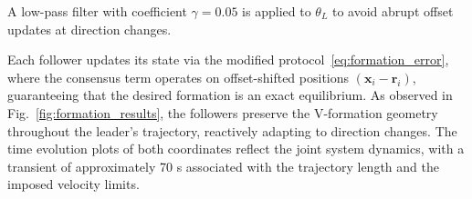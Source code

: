 A low-pass filter with coefficient $\gamma = 0.05$ is applied to $\theta_L$ to avoid abrupt offset updates at direction changes.

Each follower updates its state via the modified protocol~\eqref{eq:formation_error}, where the consensus term operates on offset-shifted positions $(\mathbf{x}_i - \mathbf{r}_i)$, guaranteeing that the desired formation is an exact equilibrium. As observed in Fig.~\ref{fig:formation_results}, the followers preserve the V-formation geometry throughout the leader's trajectory, reactively adapting to direction changes. The time evolution plots of both coordinates reflect the joint system dynamics, with a transient of approximately 70 s associated with the trajectory length and the imposed velocity limits.